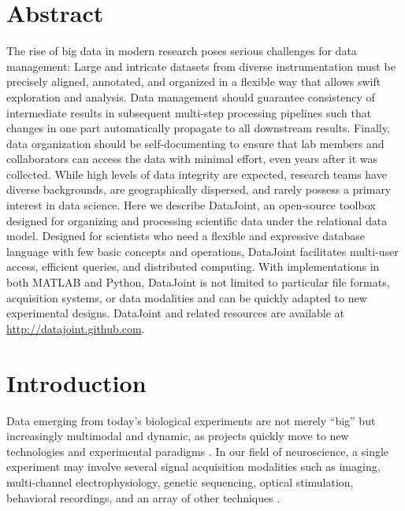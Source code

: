 \documentclass[10pt,letterpaper]{article}
\begin{document}
\section*{Abstract}
The rise of big data in modern research poses serious challenges for
data management: Large and intricate datasets from diverse
instrumentation must be precisely aligned, annotated, and organized in
a flexible way that allows swift exploration and analysis. Data
management should guarantee consistency of intermediate results in
subsequent multi-step processing pipelines such that changes in one
part automatically propagate to all downstream results. Finally, data
organization should be self-documenting to ensure that lab members and
collaborators can access the data with minimal effort, even years
after it was collected. While high levels of data integrity are
expected, research teams have diverse backgrounds, are geographically
dispersed, and rarely possess a primary interest in data science.
Here we describe DataJoint, an open-source toolbox designed for
organizing and processing scientific data under the relational data
model.  Designed for scientists who need a flexible and expressive
database language with few basic concepts and operations, DataJoint
facilitates multi-user access, efficient queries, and distributed
computing.  With implementations in both MATLAB and Python, DataJoint
is not limited to particular file formats, acquisition systems, or
data modalities and can be quickly adapted to new experimental
designs.  DataJoint and related resources are available at
\url{http://datajoint.github.com}.



\linenumbers

\section*{Introduction}
Data emerging from today's biological experiments are not merely ``big'' but increasingly multimodal and dynamic, as projects quickly move to new technologies and experimental paradigms \cite{howe_big_2008, maze_analytical_2014, editorial_focus_2014, anderson_issues_2007, kandel_neuroscience_2013, gray_scientific_2005}.
In our field of neuroscience, a single experiment may involve several signal acquisition modalities such as imaging, multi-channel electrophysiology, genetic sequencing, optical stimulation, behavioral recordings, and an array of other techniques \cite{reimer_pupil_2014,froudarakis_population_2014}.
\end{document}
